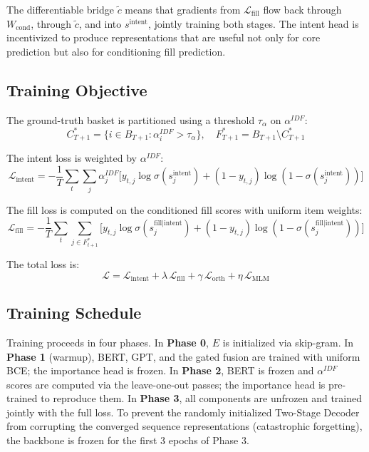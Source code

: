 \documentclass[conference]{IEEEtran}
\begin{document}
The differentiable bridge $\tilde{c}$ means that gradients from
$\mathcal{L}_{\text{fill}}$ flow back through $W_{\text{cond}}$,
through $\tilde{c}$, and into $s^{\text{intent}}$, jointly training
both stages. The intent head is incentivized to produce representations
that are useful not only for core prediction but also for conditioning
fill prediction.

\subsection{Training Objective}

The ground-truth basket is partitioned using a threshold $\tau_\alpha$
on $\alpha^{IDF}$:
\begin{equation}
C^*_{T+1} = \{i \in B_{T+1} : \alpha_i^{IDF} > \tau_\alpha\},\quad
F^*_{T+1} = B_{T+1} \setminus C^*_{T+1}
\end{equation}

The intent loss is weighted by $\alpha^{IDF}$:
\begin{equation}
\mathcal{L}_{\text{intent}} = -\frac{1}{T}\sum_t \sum_j \alpha_j^{IDF}
  \bigl[y_{t,j}\log\sigma(s_j^{\text{intent}})
       + (1-y_{t,j})\log(1-\sigma(s_j^{\text{intent}}))\bigr]
\end{equation}

The fill loss is computed on the conditioned fill scores with uniform
item weights:
\begin{equation}
\mathcal{L}_{\text{fill}} = -\frac{1}{T}\sum_t
  \sum_{j \in F^*_{t+1}}
  \bigl[y_{t,j}\log\sigma(s_j^{\text{fill}\mid\text{intent}})
       + (1-y_{t,j})\log(1-\sigma(s_j^{\text{fill}\mid\text{intent}}))\bigr]
\end{equation}

The total loss is:
\begin{equation}
\mathcal{L} = \mathcal{L}_{\text{intent}}
            + \lambda\,\mathcal{L}_{\text{fill}}
            + \gamma\,\mathcal{L}_{\text{orth}}
            + \eta\,\mathcal{L}_{\text{MLM}}
\end{equation}

\subsection{Training Schedule}
Training proceeds in four phases. In \textbf{Phase 0}, $E$ is
initialized via skip-gram. In \textbf{Phase 1} (warmup), BERT, GPT,
and the gated fusion are trained with uniform BCE; the importance head
is frozen. In \textbf{Phase 2}, BERT is frozen and $\alpha^{IDF}$
scores are computed via the leave-one-out passes; the importance head
is pre-trained to reproduce them. In \textbf{Phase 3}, all components are unfrozen and trained jointly with the full loss. To prevent the randomly initialized Two-Stage Decoder from corrupting the converged sequence representations (catastrophic forgetting), the backbone is frozen for the first 3 epochs of Phase 3.
\end{document}
